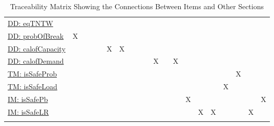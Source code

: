 \documentclass[12pt]{article}
\begin{document}
\begin{longtable}{l l l l l l l l l l l l l l l l l l l l}
\\
\hyperref[DD:eqTNTW]{DD: eqTNTW} &  &  &  &  &  &  &  &  &  &  &  &  &  &  &  &  &  &  & 
\\
\hyperref[DD:probOfBreak]{DD: probOfBreak} & X &  &  &  &  &  &  &  &  &  &  &  &  &  &  &  &  &  & 
\\
\hyperref[DD:calofCapacity]{DD: calofCapacity} &  &  &  &  & X & X &  &  &  &  &  &  &  &  &  &  &  &  & 
\\
\hyperref[DD:calofDemand]{DD: calofDemand} &  &  &  &  &  &  &  &  &  & X &  & X &  &  &  &  &  &  & 
\\
\hyperref[TM:isSafeProb]{TM: isSafeProb} &  &  &  &  &  &  &  &  &  &  &  &  &  &  &  &  & X &  & 
\\
\hyperref[TM:isSafeLoad]{TM: isSafeLoad} &  &  &  &  &  &  &  &  &  &  &  &  &  &  &  & X &  &  & 
\\
\hyperref[IM:isSafePb]{IM: isSafePb} &  &  &  &  &  &  &  &  &  &  &  &  & X &  &  &  &  &  & X
\\
\hyperref[IM:isSafeLR]{IM: isSafeLR} &  &  &  &  &  &  &  &  &  &  &  &  &  & X & X &  &  & X & 
\\
\bottomrule
\caption{Traceability Matrix Showing the Connections Between Items and Other Sections}
\label{Table:TraceMatRefvsRef}
\end{longtable}
\end{document}

